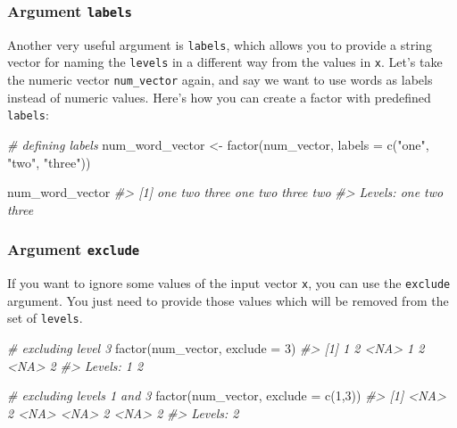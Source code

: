 \documentclass[
]{book}
\newenvironment{Shaded}{\begin{snugshade}}{\end{snugshade}}
\newcommand{\AttributeTok}[1]{\textcolor[rgb]{0.77,0.63,0.00}{#1}}
\newcommand{\CommentTok}[1]{\textcolor[rgb]{0.56,0.35,0.01}{\textit{#1}}}
\newcommand{\DecValTok}[1]{\textcolor[rgb]{0.00,0.00,0.81}{#1}}
\newcommand{\FunctionTok}[1]{\textcolor[rgb]{0.00,0.00,0.00}{#1}}
\newcommand{\NormalTok}[1]{#1}
\newcommand{\OtherTok}[1]{\textcolor[rgb]{0.56,0.35,0.01}{#1}}
\newcommand{\StringTok}[1]{\textcolor[rgb]{0.31,0.60,0.02}{#1}}
\begin{document}
\hypertarget{argument-labels}{%
\subsubsection*{\texorpdfstring{Argument \texttt{labels}}{Argument labels}}\label{argument-labels}}

Another very useful argument is \texttt{labels}, which allows you to provide a string
vector for naming the \texttt{levels} in a different way from the values in \texttt{x}. Let's
take the numeric vector \texttt{num\_vector} again, and say we want to use words as
labels instead of numeric values. Here's how you can create a factor with
predefined \texttt{labels}:

\begin{Shaded}
\begin{Highlighting}[]
\CommentTok{\# defining labels}
\NormalTok{num\_word\_vector }\OtherTok{\textless{}{-}} \FunctionTok{factor}\NormalTok{(num\_vector, }\AttributeTok{labels =} \FunctionTok{c}\NormalTok{(}\StringTok{"one"}\NormalTok{, }\StringTok{"two"}\NormalTok{, }\StringTok{"three"}\NormalTok{))}

\NormalTok{num\_word\_vector}
\CommentTok{\#\textgreater{} [1] one   two   three one   two   three two  }
\CommentTok{\#\textgreater{} Levels: one two three}
\end{Highlighting}
\end{Shaded}

\hypertarget{argument-exclude}{%
\subsubsection*{\texorpdfstring{Argument \texttt{exclude}}{Argument exclude}}\label{argument-exclude}}

If you want to ignore some values of the input vector \texttt{x}, you can use the
\texttt{exclude} argument. You just need to provide those values which will be removed
from the set of \texttt{levels}.

\begin{Shaded}
\begin{Highlighting}[]
\CommentTok{\# excluding level 3}
\FunctionTok{factor}\NormalTok{(num\_vector, }\AttributeTok{exclude =} \DecValTok{3}\NormalTok{)}
\CommentTok{\#\textgreater{} [1] 1    2    \textless{}NA\textgreater{} 1    2    \textless{}NA\textgreater{} 2   }
\CommentTok{\#\textgreater{} Levels: 1 2}

\CommentTok{\# excluding levels 1 and 3}
\FunctionTok{factor}\NormalTok{(num\_vector, }\AttributeTok{exclude =} \FunctionTok{c}\NormalTok{(}\DecValTok{1}\NormalTok{,}\DecValTok{3}\NormalTok{))}
\CommentTok{\#\textgreater{} [1] \textless{}NA\textgreater{} 2    \textless{}NA\textgreater{} \textless{}NA\textgreater{} 2    \textless{}NA\textgreater{} 2   }
\CommentTok{\#\textgreater{} Levels: 2}
\end{Highlighting}
\end{Shaded}
\end{document}
